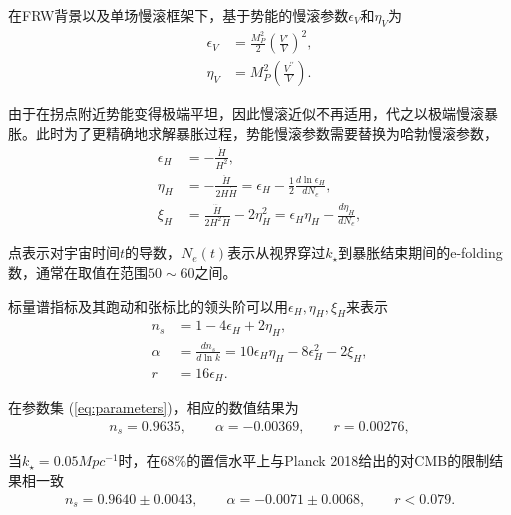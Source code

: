 在FRW背景以及单场慢滚框架下，基于势能的慢滚参数$\epsilon_V$和$\eta_V$为
\begin{align}
    \epsilon_V &= \frac{M^2_P}{2}{\left(\frac{V\prime}{V}\right)}^2, \\
    \eta_V &= M^2_P {\left(\frac{V^{\prime\prime}}{V}\right)}.
\end{align}

由于在拐点附近势能变得极端平坦，因此慢滚近似不再适用\citep{dimopoulos2017ultra,germani2017primordial}，代之以极端慢滚暴胀。此时为了更精确地求解暴胀过程，势能慢滚参数需要替换为哈勃慢滚参数\citep{schwarz2001higher,leach2002cosmological,schwarz2004primordial}，
\begin{align}
    \epsilon_H &= -\frac{\dot{H}}{H^2}, \\
    \eta_H &= -\frac{\ddot{H}}{2H\dot{H}}=\epsilon_H-\frac{1}{2}\frac{d \ln\epsilon_H}{dN_e}, \\
    \xi_H &=
    \frac{\dddot{H}}{2H^2\dot{H}}-2\eta^2_H=\epsilon_H\eta_H-\frac{d\eta_H}{dN_e},
\end{align}

点$\dot{}$表示对宇宙时间$t$的导数，$N_e(t)$表示从视界穿过$k_{\star}$到暴胀结束期间的e-folding数，通常在取值在范围$50\sim60$之间。

标量谱指标及其跑动和张标比的领头阶可以用$\epsilon_H,\eta_H,\xi_H$来表示
\begin{align}
    n_s &= 1- 4\epsilon_H+2\eta_H, \\
    \alpha &= \frac{dn_s}{d\ln k}=10\epsilon_H\eta_H-8\epsilon_H^2-2\xi_H, \\
    r &= 16\epsilon_H.
\end{align}

在参数集 (\ref{eq:parameters})，相应的数值结果为
\begin{align}
    n_s = 0.9635,\qquad \alpha=-0.00369,\qquad r=0.00276,
\end{align}

当$k_{\star}=0.05Mpc^{-1}$时，在$68\%$的置信水平上与Planck
2018给出的对CMB的限制结果相一致\citep{akrami2018planck}
\begin{align}
    n_s = 0.9640\pm 0.0043,\qquad 
    \alpha = -0.0071\pm 0.0068,\qquad
    r < 0.079.
\end{align}

